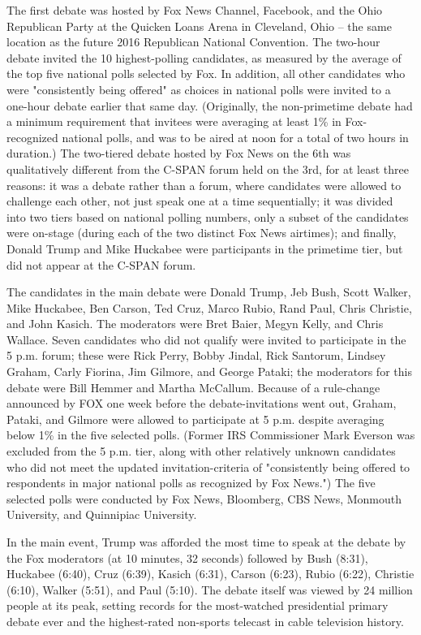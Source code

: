 The first debate was hosted by Fox News Channel, Facebook, and the Ohio
Republican Party at the Quicken Loans Arena in Cleveland, Ohio -- the
same location as the future 2016 Republican National Convention. The
two-hour debate invited the 10 highest-polling candidates, as measured
by the average of the top five national polls selected by Fox. In
addition, all other candidates who were "consistently being offered" as
choices in national polls were invited to a one-hour debate earlier that
same day. (Originally, the non-primetime debate had a minimum
requirement that invitees were averaging at least 1\% in Fox-recognized
national polls, and was to be aired at noon for a total of two hours in
duration.) The two-tiered debate hosted by Fox News on the 6th was
qualitatively different from the C-SPAN forum held on the 3rd, for at
least three reasons: it was a debate rather than a forum, where
candidates were allowed to challenge each other, not just speak one at a
time sequentially; it was divided into two tiers based on national
polling numbers, only a subset of the candidates were on-stage (during
each of the two distinct Fox News airtimes); and finally, Donald Trump
and Mike Huckabee were participants in the primetime tier, but did not
appear at the C-SPAN forum.

The candidates in the main debate were Donald Trump, Jeb Bush, Scott
Walker, Mike Huckabee, Ben Carson, Ted Cruz, Marco Rubio, Rand Paul,
Chris Christie, and John Kasich. The moderators were Bret Baier, Megyn
Kelly, and Chris Wallace. Seven candidates who did not qualify were
invited to participate in the 5 p.m. forum; these were Rick Perry, Bobby
Jindal, Rick Santorum, Lindsey Graham, Carly Fiorina, Jim Gilmore, and
George Pataki; the moderators for this debate were Bill Hemmer and
Martha McCallum. Because of a rule-change announced by FOX one week
before the debate-invitations went out, Graham, Pataki, and Gilmore were
allowed to participate at 5 p.m. despite averaging below 1\% in the five
selected polls. (Former IRS Commissioner Mark Everson was excluded from
the 5 p.m. tier, along with other relatively unknown candidates who did
not meet the updated invitation-criteria of "consistently being offered
to respondents in major national polls as recognized by Fox News.") The
five selected polls were conducted by Fox News, Bloomberg, CBS News,
Monmouth University, and Quinnipiac University.

In the main event, Trump was afforded the most time to speak at the
debate by the Fox moderators (at 10 minutes, 32 seconds) followed by
Bush (8:31), Huckabee (6:40), Cruz (6:39), Kasich (6:31), Carson (6:23),
Rubio (6:22), Christie (6:10), Walker (5:51), and Paul (5:10). The
debate itself was viewed by 24 million people at its peak, setting
records for the most-watched presidential primary debate ever and the
highest-rated non-sports telecast in cable television history.

